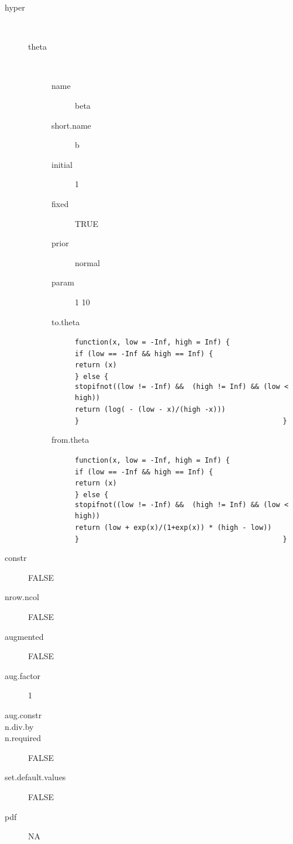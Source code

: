 \begin{description}
	\item[hyper]\ 
	 \begin{description}
	 	\item[theta]\ 
	 	 \begin{description}
	 	 	 \item[ name ] beta 
	 	 	 \item[ short.name ] b 
	 	 	 \item[ initial ] 1 
	 	 	 \item[ fixed ] TRUE 
	 	 	 \item[ prior ] normal 
	 	 	 \item[ param ] 1 10 
	 	 	 \item[ to.theta ] \verb|function(x, low = -Inf, high = Inf) {| \verb|                                                    if (low == -Inf && high == Inf) {| \verb|                                                        return (x)| \verb|                                                    } else {| \verb|                                                        stopifnot((low != -Inf) &&  (high != Inf) && (low < high))| \verb|                                                        return (log( - (low - x)/(high -x))) | \verb|                                                    }| \verb|                                                }| 
	 	 	 \item[ from.theta ] \verb|function(x, low = -Inf, high = Inf) {| \verb|                                                    if (low == -Inf && high == Inf) {| \verb|                                                        return (x)| \verb|                                                    } else {| \verb|                                                        stopifnot((low != -Inf) &&  (high != Inf) && (low < high))| \verb|                                                        return (low + exp(x)/(1+exp(x)) * (high - low))| \verb|                                                    }| \verb|                                                }| 
	 	 \end{description}
	 \end{description}
	 \item[ constr ] FALSE 
	 \item[ nrow.ncol ] FALSE 
	 \item[ augmented ] FALSE 
	 \item[ aug.factor ] 1 
	 \item[ aug.constr ]  
	 \item[ n.div.by ]  
	 \item[ n.required ] FALSE 
	 \item[ set.default.values ] FALSE 
	 \item[ pdf ] NA 
\end{description}

